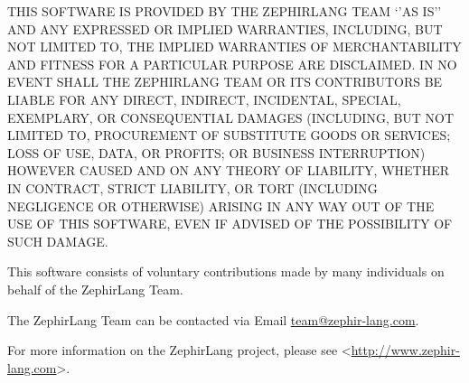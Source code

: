 \documentclass[letterpaper,10pt,english]{sphinxmanual}
\begin{document}
THIS SOFTWARE IS PROVIDED BY THE ZEPHIRLANG TEAM `'AS IS'' AND
ANY EXPRESSED OR IMPLIED WARRANTIES, INCLUDING, BUT NOT LIMITED TO,
THE IMPLIED WARRANTIES OF MERCHANTABILITY AND FITNESS FOR A
PARTICULAR PURPOSE ARE DISCLAIMED.  IN NO EVENT SHALL THE ZEPHIRLANG
TEAM OR ITS CONTRIBUTORS BE LIABLE FOR ANY DIRECT,
INDIRECT, INCIDENTAL, SPECIAL, EXEMPLARY, OR CONSEQUENTIAL DAMAGES
(INCLUDING, BUT NOT LIMITED TO, PROCUREMENT OF SUBSTITUTE GOODS OR
SERVICES; LOSS OF USE, DATA, OR PROFITS; OR BUSINESS INTERRUPTION)
HOWEVER CAUSED AND ON ANY THEORY OF LIABILITY, WHETHER IN CONTRACT,
STRICT LIABILITY, OR TORT (INCLUDING NEGLIGENCE OR OTHERWISE)
ARISING IN ANY WAY OUT OF THE USE OF THIS SOFTWARE, EVEN IF ADVISED
OF THE POSSIBILITY OF SUCH DAMAGE.

This software consists of voluntary contributions made by many
individuals on behalf of the ZephirLang Team.

The ZephirLang Team can be contacted via Email \href{mailto:team@zephir-lang.com}{team@zephir-lang.com}.

For more information on the ZephirLang project,
please see \textless{}\href{http://www.zephir-lang.com}{http://www.zephir-lang.com}\textgreater{}.



\renewcommand{\indexname}{Index}
\printindex
\end{document}
